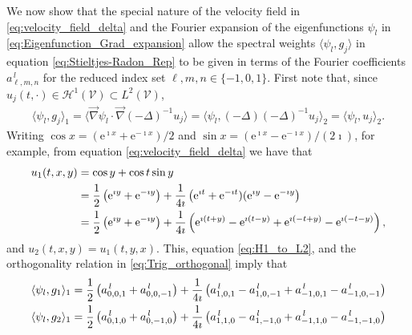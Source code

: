 \documentclass{article}
\newcommand{\e}{\mathrm{e}}
\newcommand{\Hc}{\mathcal{H}}
\newcommand{\Vc}{\mathcal{V}}
\newcommand{\0}{\mathbf{0}}
\newcommand{\1}{\mathbf{1}}
\newcommand{\2}{\mathbf{2}}
\newcommand{\3}{\mathbf{3}}
\newcommand{\4}{\mathbf{4}}
\newcommand{\5}{\mathbf{5}}
\newcommand{\6}{\mathbf{6}}
\newcommand{\7}{\mathbf{7}}
\newcommand{\8}{\mathbf{8}}
\begin{document}
We now show that the special nature of the velocity field in
\eqref{eq:velocity_field_delta} and the Fourier expansion of the eigenfunctions $\psi_l$ in  
\eqref{eq:Eigenfunction_Grad_expansion} allow the spectral weights
$\langle\psi_l,g_j\rangle$ in equation \eqref{eq:Stieltjes-Radon_Rep} to be given in
terms of the Fourier coefficients $a^{\,l}_{\ell,m,n}$ for the reduced
index set $\ell,m,n\in\{-1,0,1\}$. First note that, since
$u_j(t,\cdot)\in\Hc^1(\Vc)\subset L^2(\Vc)$,
%
\begin{align}\label{eq:H1_to_L2}
  \langle\psi_l,g_j\rangle_1=\langle\vec{\nabla}\psi_l\cdot\vec{\nabla}(-\Delta)^{-1}u_j\rangle
         =\langle\psi_l,(-\Delta)(-\Delta)^{-1}u_j\rangle_2
         =\langle\psi_l,u_j\rangle_2.
\end{align}
%
Writing
$\cos{x}=(\e^{\imath x}+\e^{-\imath x})/2$ and
$\sin{x}=(\e^{\imath x}-\e^{-\imath x})/(2\imath)$, for example, from equation
\eqref{eq:velocity_field_delta} we have that 
%
\begin{align}
  u_1(t,x,y)&=\cos{y}+\cos{t}\sin{y}\\
           &=\frac{1}{2}\left(\e^{\imath y}+\e^{-\imath y}\right)
            +\frac{1}{4\imath}\left(\e^{\imath t}+\e^{-\imath t})(\e^{\imath y}-\e^{-\imath y}\right)
            \notag\\
           &=\frac{1}{2}\left(\e^{\imath y}+\e^{-\imath y}\right)
            +\frac{1}{4\imath}\left(\e^{\imath(t+y)}-\e^{\imath(t-y)}+\e^{\imath(-t+y)}-\e^{\imath(-t-y)}\right),
            \notag
\end{align}
%
and $u_2(t,x,y)=u_1(t,y,x)$. This, equation \eqref{eq:H1_to_L2}, and the
orthogonality relation in \eqref{eq:Trig_orthogonal} imply that
%
\begin{align}\label{eq:Inner_Products_2D}
  \langle\psi_l,g_1\rangle_1=\frac{1}{2}\left(a^{\,l}_{0,0,1}+a^{\,l}_{0,0,-1}\right)
               +\frac{1}{4\imath}\left(a^{\,l}_{1,0,1}-a^{\,l}_{1,0,-1}+a^{\,l}_{-1,0,1}-a^{\,l}_{-1,0,-1}\right) 
               \\
  \langle\psi_l,g_2\rangle_1=\frac{1}{2}\left(a^{\,l}_{0,1,0}+a^{\,l}_{0,-1,0}\right)
               +\frac{1}{4\imath}\left(a^{\,l}_{1,1,0}-a^{\,l}_{1,-1,0}+a^{\,l}_{-1,1,0}-a^{\,l}_{-1,-1,0}\right)
               \notag
\end{align}
%
\end{document}
